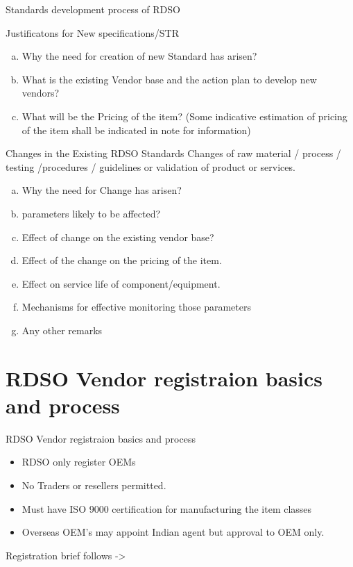 \documentclass[
  10pt,
  ignorenonframetext,
  aspectratio=43,
]{beamer}
\providecommand{\tightlist}{%
  \setlength{\itemsep}{0pt}\setlength{\parskip}{0pt}}
\begin{document}
\begin{frame}{Standards development process of RDSO}
\protect\hypertarget{standards-development-process-of-rdso}{}
\begin{block}{Justificatons for New specifications/STR}
\protect\hypertarget{justificatons-for-new-specificationsstr}{}
\begin{enumerate}
[a)]
\tightlist
\item
  Why the need for creation of new Standard has arisen?
\item
  What is the existing Vendor base and the action plan to develop new
  vendors?
\item
  What will be the Pricing of the item? (Some indicative estimation of
  pricing of the item shall be indicated in note for information)
\end{enumerate}
\end{block}

\begin{block}{Changes in the Existing RDSO Standards}
\protect\hypertarget{changes-in-the-existing-rdso-standards}{}
Changes of raw material / process / testing /procedures / guidelines or
validation of product or services.

\begin{enumerate}
[a)]
\tightlist
\item
  Why the need for Change has arisen?
\item
  parameters likely to be affected?
\item
  Effect of change on the existing vendor base?
\item
  Effect of the change on the pricing of the item.
\item
  Effect on service life of component/equipment.
\item
  Mechanisms for effective monitoring those parameters
\item
  Any other remarks
\end{enumerate}
\end{block}
\end{frame}

\hypertarget{rdso-vendor-registraion-basics-and-process}{%
\section{RDSO Vendor registraion basics and
process}\label{rdso-vendor-registraion-basics-and-process}}

\begin{frame}{RDSO Vendor registraion basics and process}
\begin{itemize}
\tightlist
\item
  RDSO only register OEMs
\item
  No Traders or resellers permitted.
\item
  Must have ISO 9000 certification for manufacturing the item classes
\item
  Overseas OEM's may appoint Indian agent but approval to OEM only.
\end{itemize}

Registration brief follows -\textgreater{}
\end{frame}
\end{document}
